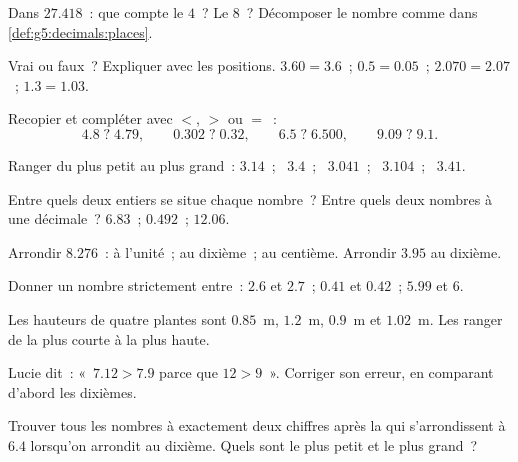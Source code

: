 \begin{exercise}[$\star$]\label{exo:g5:decimals:2}
Dans $27.418$~: que compte le $4$~? Le $8$~? Décomposer le nombre
comme dans \cref{def:g5:decimals:places}.
\end{exercise}

\begin{exercise}[$\star$]\label{exo:g5:decimals:3}
Vrai ou faux~? Expliquer avec les positions.
$3.60 = 3.6$~; \quad $0.5 = 0.05$~; \quad $2.070 = 2.07$~; \quad
$1.3 = 1.03$.
\end{exercise}

\begin{exercise}[$\star$]\label{exo:g5:decimals:4}
Recopier et compléter avec $<$, $>$ ou $=$~:
\[
4.8 \;?\; 4.79, \qquad
0.302 \;?\; 0.32, \qquad
6.5 \;?\; 6.500, \qquad
9.09 \;?\; 9.1 .
\]
\end{exercise}

\begin{exercise}[$\star$]\label{exo:g5:decimals:5}
Ranger du plus petit au plus grand~: $3.14$~; \ $3.4$~; \ $3.041$~; \
$3.104$~; \ $3.41$.
\end{exercise}

\begin{exercise}[$\star$]\label{exo:g5:decimals:6}
Entre quels deux entiers se situe chaque nombre~? Entre quels deux
nombres à une décimale~? \quad $6.83$~; \quad $0.492$~; \quad
$12.06$.
\end{exercise}

\begin{exercise}[$\star$]\label{exo:g5:decimals:7}
Arrondir $8.276$~: à l'unité~; au dixième~; au centième. Arrondir
$3.95$ au dixième.
\end{exercise}

\begin{exercise}[$\star$]\label{exo:g5:decimals:8}
Donner un nombre strictement entre~: $2.6$ et $2.7$~; \quad $0.41$
et $0.42$~; \quad $5.99$ et $6$.
\end{exercise}

\begin{exercise}[$\star$]\label{exo:g5:decimals:9}
Les hauteurs de quatre plantes sont $0.85$~m, $1.2$~m, $0.9$~m et
$1.02$~m. Les ranger de la plus courte à la plus haute.
\end{exercise}

\begin{exercise}[$\star\star$]\label{exo:g5:decimals:10}
Lucie dit~: «~$7.12 > 7.9$ parce que $12 > 9$~». Corriger son
erreur, en comparant d'abord les dixièmes.
\end{exercise}

\begin{exercise}[$\star\star$]\label{exo:g5:decimals:11}
Trouver tous les nombres à exactement deux chiffres après la
 qui s'arrondissent à $6.4$ lorsqu'on arrondit au dixième.
Quels sont le plus petit et le plus grand~?
\end{exercise}
